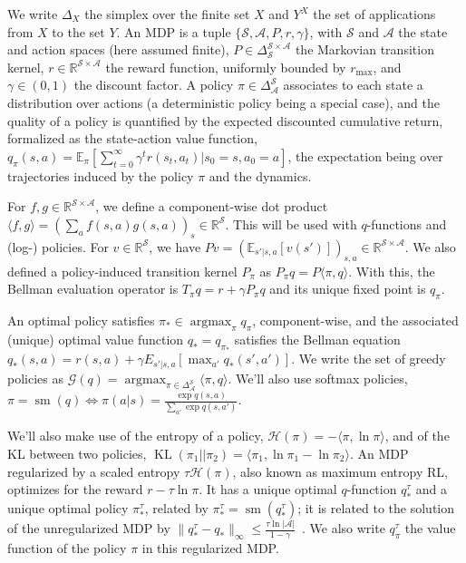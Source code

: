 \documentclass{article}
\newcommand{\gr}{\mathcal{G}}
\newcommand{\E}{\mathbb{E}}
\newcommand{\h}{\mathcal{H}}
\DeclareMathOperator*{\argmax}{argmax}
\DeclareMathOperator*{\softmax}{sm}
\DeclareMathOperator{\kl}{KL}
\newcommand{\states}{\mathcal{S}}
\newcommand{\actions}{\mathcal{A}}
\begin{document}
We write $\Delta_X$ the simplex over the finite set $X$ and $Y^X$ the set of applications from $X$ to the set $Y$. An MDP is a tuple $\{\states, \actions, P, r, \gamma\}$, with $\states$ and $\actions$ the state and action spaces (here assumed finite), $P\in\Delta_{\states}^{\states\times\actions}$ the Markovian transition kernel, $r\in\mathbb{R}^{\states\times\actions}$ the reward function, uniformly bounded by $r_\text{max}$, and $\gamma\in(0,1)$ the discount factor. A policy $\pi\in\Delta_\actions^\states$ associates to each state a distribution over actions (a deterministic policy being a special case), and the quality of a policy is quantified by the expected discounted cumulative return, formalized as the state-action value function, $q_\pi(s,a) = \mathbb{E}_\pi[\sum_{t=0}^\infty \gamma^t r(s_t, a_t) | s_0=s, a_0 = a]$, the expectation being over trajectories induced by the policy $\pi$ and the dynamics. 

For $f,g\in\mathbb{R}^{\states\times\actions}$, we define a component-wise dot product $\langle f, g\rangle = (\sum_{a}f(s,a) g(s,a))_s\in\mathbb{R}^\states$. This will be used with $q$-functions and (log-) policies. For $v\in\mathbb{R}^\states$, we have $P v = (\E_{s'|s,a}[v(s')])_{s,a} \in\mathbb{R}^{\states\times\actions}$. We also defined a policy-induced transition kernel $P_\pi$ as $P_\pi q = P \langle \pi, q\rangle$. With this, the Bellman evaluation operator is $T_\pi q = r + \gamma P_\pi q$ and its unique fixed point is $q_\pi$.

An optimal policy satisfies $\pi_*\in\argmax_{\pi} q_\pi$, component-wise, and the associated (unique) optimal value function $q_* = q_{\pi_*}$ satisfies the Bellman equation $q_*(s,a) = r(s,a) + \gamma E_{s'|s,a}[\max_{a'}q_*(s',a')]$. We write the set of greedy policies as $\gr(q) = \argmax_{\pi\in\Delta_\actions^\states}\langle\pi, q\rangle$. We'll also use softmax policies, $\pi=\softmax(q) \Leftrightarrow \pi(a|s) = \frac{\exp q(s,a)}{\sum_{a'} \exp q(s,a')}$.

We'll also make use of the entropy of a policy, $\h(\pi) = -\langle \pi,\ln \pi\rangle$, and of the KL between two policies, $\kl(\pi_1||\pi_2) = \langle \pi_1, \ln\pi_1 - \ln\pi_2\rangle$. An MDP regularized by a scaled entropy $\tau\h(\pi)$, also known as maximum entropy RL, optimizes for the reward $r - \tau \ln \pi$. It has a unique optimal $q$-function $q_*^\tau$ and a unique optimal policy $\pi_*^\tau$, related by $\pi_*^\tau = \softmax(q_*^\tau)$; it is related to the solution of the unregularized MDP by $\|q_*^\tau - q_*\|_\infty \leq \frac{\tau \ln |\actions|}{1-\gamma}$~\cite{geist2019theory}. We also write $q_\pi^{\tau}$ the value function of the policy $\pi$ in this regularized MDP.
\end{document}
